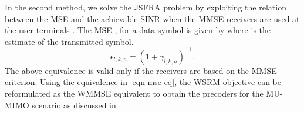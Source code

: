 In the second method, we solve the \ac{JSFRA} problem by exploiting the relation between the \ac{MSE} and the achievable \ac{SINR} when the \ac{MMSE} receivers are used at the user terminals \cite{mse_duality,christensen2008weighted}. The \ac{MSE} , for a data symbol  is given by
\iftoggle{single_column}{
\begin{multline} \label{mse-error}
	\mathbb{E} \big [ ( d_{l,k,n} - \hat{d}_{l,k,n} )^2 \big ] = \left | 1 - \mvec{w}{l,k,n}^\herm \mvec{H}{b_k,k,n} \mvec{m}{l,k,n} \right |^2 + \sum_{\mathclap{(j,i) \neq (l,k)}} \left | \mvec{w}{l,k,n}^\herm \mvec{H}{b_i,k,n} \mvec{m}{j,i,n} \right |^2 + \enoise = \epsilon_{l,k,n}
\end{multline}}{\allowdisplaybreaks
\begin{multline} \label{mse-error}
 \mathbb{E} \big [ ( d_{l,k,n} - \hat{d}_{l,k,n} )^2 \big ] = \left | 1 - \mvec{w}{l,k,n}^\herm \mvec{H}{b_k,k,n} \mvec{m}{l,k,n} \right |^2 \\
 + \sum_{\mathclap{(j,i) \neq (l,k)}} \left | \mvec{w}{l,k,n}^\herm \mvec{H}{b_i,k,n} \mvec{m}{j,i,n} \right |^2 + \enoise = \epsilon_{l,k,n}
\end{multline}}
where  is the estimate of the transmitted symbol. 
\begin{equation} \label{eqn-mse-eq}
\epsilon_{l,k,n} = (1 + \gamma_{l,k,n})^{-1}.
\end{equation}
The above equivalence is valid only if the receivers are based on the \ac{MMSE} criterion. Using the equivalence in \eqref{eqn-mse-eq}, the \ac{WSRM} objective can be reformulated as the \ac{WMMSE} equivalent to obtain the precoders for the \acs{MU}-\acs{MIMO} scenario as discussed in \cite{christensen2008weighted,wmmse_shi,hong2012decomposition}. 

